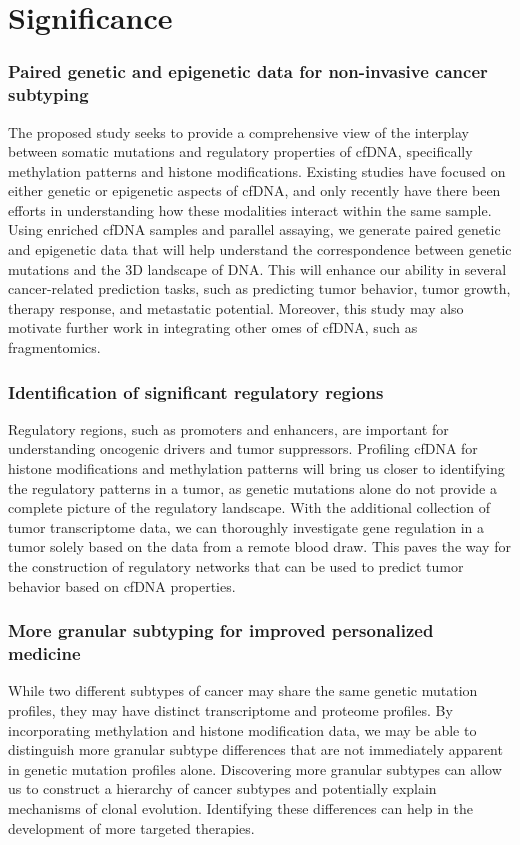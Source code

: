 \documentclass[11pt]{article}
\begin{document}
\newpage
\section*{Significance}
\subsubsection*{Paired genetic and epigenetic data for non-invasive cancer subtyping} The proposed study seeks to provide a comprehensive view of the interplay between somatic mutations and regulatory properties of cfDNA, specifically methylation patterns and histone modifications. 
Existing studies have focused on either genetic or epigenetic aspects of cfDNA, and only recently have there been efforts in understanding how these modalities interact within the same sample. \cite{bie_multimodal_2023, cui_prediction_2024}
Using enriched cfDNA samples and parallel assaying, we generate paired genetic and epigenetic data that will help understand the correspondence between genetic mutations and the 3D landscape of DNA.
This will enhance our ability in several cancer-related prediction tasks, such as predicting tumor behavior, tumor growth, therapy response, and metastatic potential. 
Moreover, this study may also motivate further work in integrating other omes of cfDNA, such as fragmentomics. \cite{penny_chromatin-_2024} 
\subsubsection*{Identification of significant regulatory regions} Regulatory regions, such as promoters and enhancers, are important for understanding oncogenic drivers and tumor suppressors. 
Profiling cfDNA for histone modifications and methylation patterns will bring us closer to identifying the regulatory patterns in a tumor, as genetic mutations alone do not provide a complete picture of the regulatory landscape. 
With the additional collection of tumor transcriptome data, we can thoroughly investigate gene regulation in a tumor solely based on the data from a remote blood draw.
This paves the way for the construction of regulatory networks that can be used to predict tumor behavior based on cfDNA properties.
\subsubsection*{More granular subtyping for improved personalized medicine}
While two different subtypes of cancer may share the same genetic mutation profiles,
they may have distinct transcriptome and proteome profiles.
By incorporating methylation and histone modification data, we may be able to
distinguish more granular subtype differences that are not immediately apparent
in genetic mutation profiles alone. \cite{heeke_tumor-_2024}
Discovering more granular subtypes can allow us to construct a hierarchy of cancer subtypes and potentially explain mechanisms of clonal evolution. 
Identifying these differences can help in the development of more targeted therapies.
\end{document}
